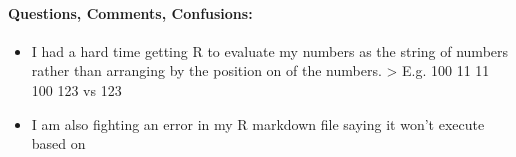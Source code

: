 \documentclass[]{article}
\let\oldparagraph\paragraph
\renewcommand{\paragraph}[1]{\oldparagraph{#1}\mbox{}}
\begin{document}
\hypertarget{questions-comments-confusions}{%
\paragraph{Questions, Comments,
Confusions:}\label{questions-comments-confusions}}

\begin{itemize}
\item
  I had a hard time getting R to evaluate my numbers as the string of
  numbers rather than arranging by the position on of the numbers.
  \textgreater{} E.g. 100 11 11 100 123 vs 123
\item
  I am also fighting an error in my R markdown file saying it won't
  execute based on
\end{itemize}
\end{document}
